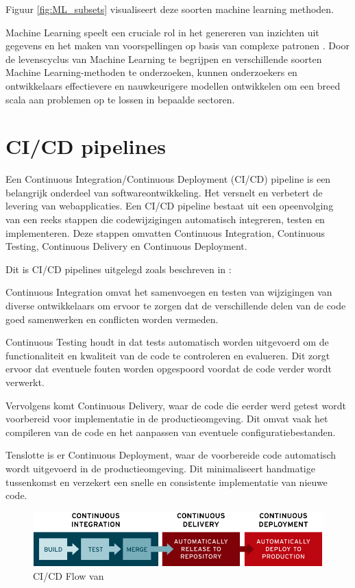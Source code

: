 Figuur \ref*{fig:ML_subsets} visualiseert deze soorten machine learning methoden.

Machine Learning speelt een cruciale rol in het genereren van inzichten uit gegevens en het maken van voorspellingen op basis van complexe patronen \autocite{Jordan2015}. Door de levenscyclus van Machine Learning te begrijpen en verschillende soorten Machine Learning-methoden te onderzoeken, kunnen onderzoekers en ontwikkelaars effectievere en nauwkeurigere modellen ontwikkelen om een breed scala aan problemen op te lossen in bepaalde sectoren.
\section{CI/CD pipelines}
Een Continuous Integration/Continuous Deployment (CI/CD) pipeline is een belangrijk onderdeel van softwareontwikkeling. Het versnelt en verbetert de levering van webapplicaties. Een CI/CD pipeline bestaat uit een opeenvolging van een reeks stappen die codewijzigingen automatisch integreren, testen en implementeren. Deze stappen omvatten Continuous Integration, Continuous Testing, Continuous Delivery en Continuous Deployment.

Dit is CI/CD pipelines uitgelegd zoals beschreven in \textcite{NaveenVemuri2024}:

Continuous Integration omvat het samenvoegen en testen van wijzigingen van diverse ontwikkelaars om ervoor te zorgen dat de verschillende delen van de code goed samenwerken en conflicten worden vermeden.

Continuous Testing houdt in dat tests automatisch worden uitgevoerd om de functionaliteit en kwaliteit van de code te controleren en evalueren. Dit zorgt ervoor dat eventuele fouten worden opgespoord voordat de code verder wordt verwerkt.

Vervolgens komt Continuous Delivery, waar de code die eerder werd getest wordt voorbereid voor implementatie in de productieomgeving. Dit omvat vaak het compileren van de code en het aanpassen van eventuele configuratiebestanden.

Tenslotte is er Continuous Deployment, waar de voorbereide code automatisch wordt uitgevoerd in de productieomgeving. Dit minimaliseert handmatige tussenkomst en verzekert een snelle en consistente implementatie van nieuwe code.\newline

\begin{figure}[h]
    \includegraphics[width=\linewidth]{graphics/cdci.png}
    \caption{CI/CD Flow van \autocite{RedHat2023}}
    \label{fig:CICD_flow}
\end{figure}
  

